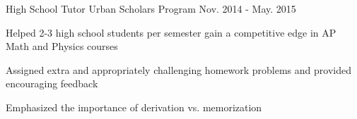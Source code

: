 \begin{cventries}
\iffalse
  \cventry
    {Office Assistant} %
    {Zahn Innovation Center} %
	{Jan. 2015 - May. 2015} %
    {} %
    {
      \begin{cvitems} %
        \item {Processed applications and deliverables from competing startups}
        \item {Sorted incoming internship and funding offers and directed them
		  to the appropriate individuals}
        \item {Discussed plans with the competing teams and provided feedback
		  on their ideas}
        \item {Organized events to inspire entrepreneurship in startup members}
      \end{cvitems}
    }
\fi

\iftrue
  \cventry
    {High School Tutor} %
    {Urban Scholars Program} %
	{Nov. 2014 - May. 2015} %
    {} %
    {
      \begin{cvitems} %
        \item {Helped 2-3 high school students per semester gain a competitive
		  edge in AP Math and Physics courses}
        \item {Assigned extra and appropriately challenging homework problems
		  and provided encouraging feedback}
        \item {Emphasized the importance of derivation vs. memorization}
      \end{cvitems}
    }
\fi


\end{cventries}

